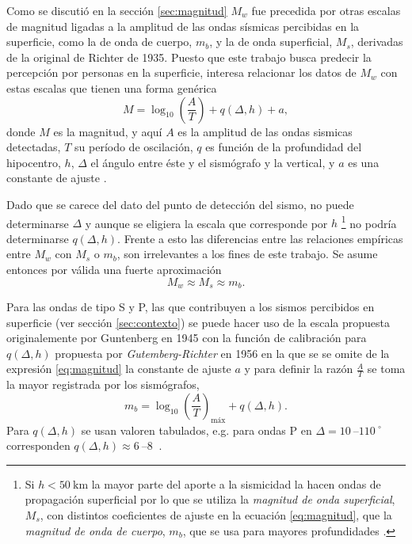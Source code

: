 \documentclass[a4paper]{report}
\begin{document}
Como se discutió en la sección \ref{sec:magnitud} \(M_w\) fue precedida por otras escalas de magnitud ligadas a la amplitud de las ondas sísmicas percibidas en la superficie, como la de onda de cuerpo, \(m_b\), y la de onda superficial, \(M_s\), derivadas de la original de Richter de 1935.
Puesto que este trabajo busca predecir la percepción por personas en la superficie, interesa relacionar los datos de \(M_w\) con estas escalas que tienen una forma genérica
\begin{equation}
	M = \log_{10} \left( \frac{A}{T} \right) + q(\Delta, h) + a,
	\label{eq:magnitud}
\end{equation}
donde \(M\) es la magnitud, y aquí \(A\) es la amplitud de las ondas sismicas detectadas, \(T\) su período de oscilación, \(q\) es función de la profundidad del hipocentro, \(h\), \(\Delta\) el ángulo entre éste y el sismógrafo y la vertical, y \(a\) es una constante de ajuste \cite[ecuación 4.13]{fowler_solid_1990}.

Dado que se carece del dato del punto de detección del sismo, no puede determinarse \(\Delta\) y aunque se eligiera la escala que corresponde por \(h\) \footnote{Si \(h< \SI{50}{\kilo\metre}\) la mayor parte del aporte a la sismicidad la hacen ondas de propagación superficial por lo que se utiliza la \emph{magnitud de onda superficial}, \(M_s\), con distintos coeficientes de ajuste en la ecuación \ref{eq:magnitud}, que la \emph{magnitud de onda de cuerpo}, \(m_b\), que se usa para mayores profundidades \cite[sección 4.2.3]{fowler_solid_1990}.} no podría determinarse \(q(\Delta, h)\).
Frente a esto las diferencias entre las relaciones empíricas entre \(M_w\) con \(M_s\) o \(m_b\)\cite{hanks_moment_1979}, son irrelevantes a los fines de este trabajo.
Se asume entonces por válida una fuerte aproximación
\begin{equation}
	M_w \approx M_s \approx m_b.
	\label{eq:igualdad}
\end{equation}

Para las ondas de tipo S y P, las que contribuyen a los sismos percibidos en superficie (ver sección \ref{sec:contexto}) se puede hacer uso de la escala propuesta originalemente por Guntenberg en 1945 con la función de calibración para \(q(\Delta, h)\) propuesta por \emph{Gutemberg-Richter} en 1956 \cite[ecuación 4.18]{fowler_solid_1990} en la que se se omite de la expresión \ref{eq:magnitud} la constante de ajuste \(a\) y para definir la razón \(\frac{A}{T}\) se toma la mayor registrada por los sismógrafos,
\begin{equation}
	m_b = \log_{10} \left( \frac{A}{T} \right)_\text{máx} + q(\Delta, h).
	\label{eq:richter}
\end{equation}
Para \(q(\Delta, h)\) se usan valoren tabulados, e.g. para ondas P en \(\Delta = \SIrange{10}{110}{} ^\circ\) corresponden \(q(\Delta, h) \approx \SIrange{6}{8}{}\) \cite{willian_l_ellsworth_earthquake_1991}.
\end{document}

